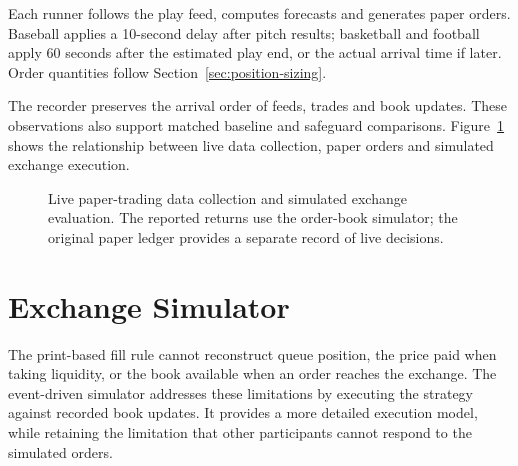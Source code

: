 \documentclass[12pt,a4paper,oneside]{report}
\begin{document}
Each runner follows the play feed, computes forecasts and generates paper
orders. Baseball applies a 10-second delay after pitch results; basketball
and football apply 60 seconds after the estimated play end, or the actual
arrival time if later. Order quantities follow
Section~\ref{sec:position-sizing}.

The recorder preserves the arrival order of feeds, trades and book updates.
These observations also support matched baseline and safeguard comparisons.
Figure~\ref{fig:live-system} shows the relationship between live data collection,
paper orders and simulated exchange execution.
\begin{figure}[htbp]\centering
{}
\caption{Live paper-trading data collection and simulated exchange evaluation.
The reported returns use the order-book simulator; the original paper ledger
provides a separate record of live decisions.}
\label{fig:live-system}
\end{figure}

\section{Exchange Simulator}\label{sec:simulator}
The print-based fill rule cannot reconstruct queue position, the price paid
when taking liquidity, or the book available when an order reaches the
exchange. The event-driven simulator addresses these limitations by executing
the strategy against recorded book updates. It provides a more detailed
execution model, while retaining the limitation that other participants cannot
respond to the simulated orders.
\end{document}
